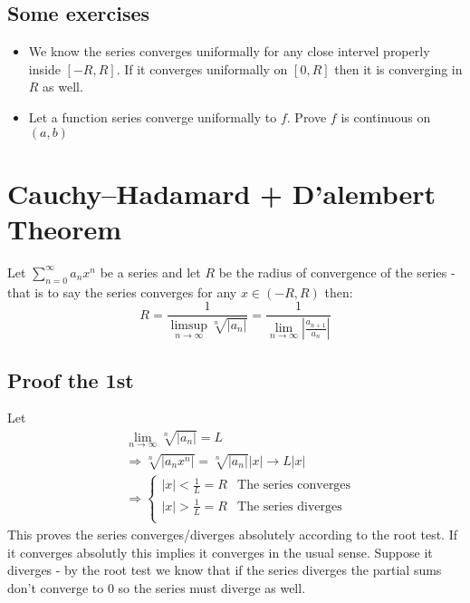 \documentclass{article}
\begin{document}
	\subsection{Some exercises}
	\begin{itemize}
		\item We know the series converges uniformally for any close intervel 
		properly inside $[-R,R]$.
	If it converges uniformally on $[0,R]$ then it is converging in $R$ as well.
		\item Let a function series converge uniformally to $f$. 
		Prove $f$ is continuous on $(a,b)$
	\end{itemize}
	
	\newpage
	
	\section{Cauchy–Hadamard + D'alembert Theorem}
	Let $\sum_{n=0}^{\infty}{a_nx^n}$ be a series and 
	let $R$ be the radius of convergence of the series - 
	that is to say the series converges for any $x\in(-R,R)$ 
	then:
	\[
		R = \frac{1}{\limsup_{n\to\infty}{\sqrt[n]{|a_n|}}}
		  = \frac{1}{\lim_{n\to\infty}{\left|\frac{a_{n+1}}
		  {a_n}\right|}}
	\]
	
	\subsection{Proof the 1st}
	Let
	\begin{align*}
		&\lim_{n\to\infty}{\sqrt[n]{|a_n|}} = L
		\\ &\Rightarrow
		\sqrt[n]{|a_nx^n|}=\sqrt[n]{|a_n|}|x|\to L|x|
		\\ &\Rightarrow
		\begin{cases}
		|x| < \frac{1}{L} = R & \text{The series converges} \\
		|x| > \frac{1}{L} = R & \text{The series diverges} \\
		\end{cases}
	\end{align*}
	This proves the series converges/diverges absolutely according to the root test. 
	If it converges absolutly this implies it converges in the usual sense. 
	Suppose it diverges - by the root test we know that 
	if the series diverges the partial sums don't converge to $0$ 
	so the series must diverge as well.
\end{document}
